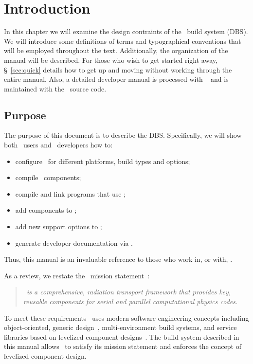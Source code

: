 
\chapter{Introduction}

In this chapter we will examine the %
design contraints of the \draco\ build system (DBS).  We will
introduce some definitions of terms and typographical conventions that
will be employed throughout the text.  Additionally, the organization
of the manual will be described.  For those who wish to get started
right away, \S~\ref{sec:quick} details how to get up and moving
without working through the entire manual.  Also, a detailed developer
manual is processed with ~\cite{doxygen} and is
maintained with the \draco\ source code.


\section{Purpose}
\label{sec:purpose}

The purpose of this document is to describe the DBS.  Specifically, we
will show both \draco\ users and \draco\ developers how to:
\begin{itemize}
\item configure \draco\ for different platforms, build types and
  options; 
\item compile \draco\ components; 
\item compile and link programs that use \draco;
\item add components to \draco;
\item add new support options to \draco;
\item generate developer documentation via .
\end{itemize}
Thus, this manual is an invaluable reference to those who work in, or
with, \draco.

As a review, we restate the \draco\ mission statement~\cite{rn98046}:
\begin{quote}
  \slshape \draco\ is a comprehensive, radiation transport framework
  that provides key, reusable components for serial and parallel
  computational physics codes.
\end{quote}  
To meet these requirements \draco\ uses modern software engineering
concepts including object-oriented, generic design~\cite{ooadid},
multi-environment build systems, and service libraries based on
levelized component designs~\cite{la96}.  The build system described
in this manual allows \draco\ to satisfy its mission statement and
enforces the concept of levelized component
design.

